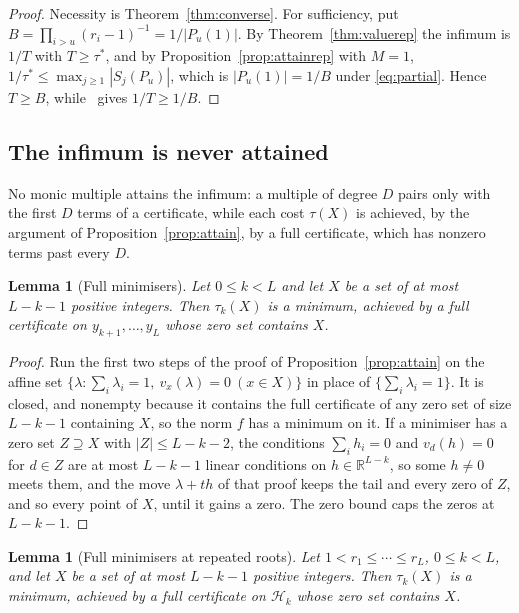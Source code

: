 \documentclass[11pt]{article}
\newtheorem{lemma}[theorem]{Lemma}
\theoremstyle{definition}
\theoremstyle{plain}
\newcommand{\R}{\mathbb R}
\begin{document}
\begin{proof}
Necessity is Theorem~\ref{thm:converse}.  For sufficiency, put
$B=\prod_{i>u}(r_i-1)^{-1}=1/|P_u(1)|$.  By Theorem~\ref{thm:valuerep} the
infimum is $1/T$ with $T\ge\tau^*$, and by Proposition~\ref{prop:attainrep}
with $M=1$, $1/\tau^*\le\max_{j\ge1}|S_j(P_u)|$, which is $|P_u(1)|=1/B$
under \eqref{eq:partial}.  Hence $T\ge B$, while~\cite[Theorem~3.2]{coefficient-mass} gives
$1/T\ge1/B$.
\end{proof}

\subsection*{The infimum is never attained}

No monic multiple attains the infimum: a multiple of degree $D$ pairs only
with the first $D$ terms of a certificate, while each cost $\tau(X)$ is
achieved, by the argument of Proposition~\ref{prop:attain}, by a full
certificate, which has nonzero terms past every $D$.

\begin{lemma}[Full minimisers]\label{lem:attainX}
Let $0\le k<L$ and let $X$ be a set of at most $L-k-1$ positive integers.  Then
$\tau_k(X)$ is a minimum, achieved by a full certificate on $y_{k+1},\ldots,y_L$ whose
zero set contains $X$.
\end{lemma}

\begin{proof}
Run the first two steps of the proof of Proposition~\ref{prop:attain} on the
affine set $\{\lambda:\sum_i\lambda_i=1,\ v_x(\lambda)=0\ (x\in X)\}$ in place
of $\{\sum_i\lambda_i=1\}$.  It is closed, and nonempty because it contains the
full certificate of any zero set of size $L-k-1$ containing $X$, so the norm
$f$ has a minimum on it.  If a minimiser has a zero set $Z\supseteq X$
with $|Z|\le L-k-2$, the conditions $\sum_ih_i=0$ and $v_d(h)=0$ for $d\in Z$
are at most $L-k-1$ linear conditions on $h\in\R^{L-k}$, so some $h\ne0$ meets
them, and the move $\lambda+th$ of that proof keeps the tail and every zero of
$Z$, and so every point of $X$, until it gains a zero.  The zero bound caps
the zeros at $L-k-1$.
\end{proof}

\begin{lemma}[Full minimisers at repeated roots]\label{lem:attainXrep}
Let $1<r_1\le\cdots\le r_L$, $0\le k<L$, and let $X$ be a set of at most
$L-k-1$ positive integers.  Then $\tau_k(X)$ is a minimum, achieved by a full
certificate on $\mathcal H_k$ whose zero set contains $X$.
\end{lemma}
\end{document}
